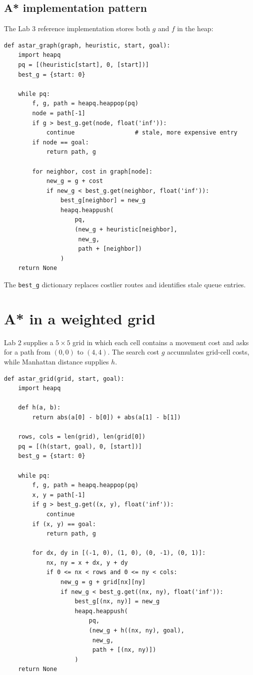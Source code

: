 \subsection{A* implementation pattern}

The Lab 3 reference implementation stores both \(g\) and \(f\) in the heap:

\begin{lstlisting}[style=mlpython]
def astar_graph(graph, heuristic, start, goal):
    import heapq
    pq = [(heuristic[start], 0, [start])]
    best_g = {start: 0}

    while pq:
        f, g, path = heapq.heappop(pq)
        node = path[-1]
        if g > best_g.get(node, float('inf')):
            continue                 # stale, more expensive entry
        if node == goal:
            return path, g

        for neighbor, cost in graph[node]:
            new_g = g + cost
            if new_g < best_g.get(neighbor, float('inf')):
                best_g[neighbor] = new_g
                heapq.heappush(
                    pq,
                    (new_g + heuristic[neighbor],
                     new_g,
                     path + [neighbor])
                )
    return None
\end{lstlisting}

The \texttt{best\_g} dictionary replaces costlier routes and identifies stale queue entries.

\section{A* in a weighted grid}

Lab 2 supplies a \(5\times5\) grid in which each cell contains a movement cost and asks for a path from \((0,0)\) to \((4,4)\). The search cost \(g\) accumulates grid-cell costs, while Manhattan distance supplies \(h\).

\begin{lstlisting}[style=mlpython]
def astar_grid(grid, start, goal):
    import heapq

    def h(a, b):
        return abs(a[0] - b[0]) + abs(a[1] - b[1])

    rows, cols = len(grid), len(grid[0])
    pq = [(h(start, goal), 0, [start])]
    best_g = {start: 0}

    while pq:
        f, g, path = heapq.heappop(pq)
        x, y = path[-1]
        if g > best_g.get((x, y), float('inf')):
            continue
        if (x, y) == goal:
            return path, g

        for dx, dy in [(-1, 0), (1, 0), (0, -1), (0, 1)]:
            nx, ny = x + dx, y + dy
            if 0 <= nx < rows and 0 <= ny < cols:
                new_g = g + grid[nx][ny]
                if new_g < best_g.get((nx, ny), float('inf')):
                    best_g[(nx, ny)] = new_g
                    heapq.heappush(
                        pq,
                        (new_g + h((nx, ny), goal),
                         new_g,
                         path + [(nx, ny)])
                    )
    return None
\end{lstlisting}

